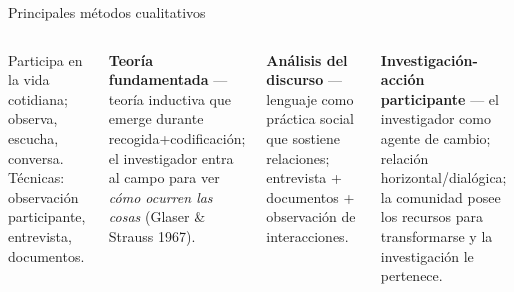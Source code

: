 \documentclass[aspectratio=169,8pt]{beamer}
\begin{document}
\begin{frame}{Principales m\'etodos cualitativos}
  \small
  \begin{columns}[T,onlytextwidth]
      \begin{tcolorbox}[formulabox,title=Etnogr\'afico / naturalista]
        \footnotesize Participa en la vida cotidiana; observa, escucha, conversa. T\'ecnicas: observaci\'on participante, entrevista, documentos.
      \end{tcolorbox}
      \begin{tcolorbox}[tealbox]
        \footnotesize\textbf{Teor\'ia fundamentada} --- teor\'ia inductiva que emerge durante recogida+codificaci\'on; el investigador entra al campo para ver \emph{c\'omo ocurren las cosas} (Glaser \& Strauss 1967).
      \end{tcolorbox}
      \begin{tcolorbox}[amberbox]
        \footnotesize\textbf{An\'alisis del discurso} --- lenguaje como pr\'actica social que sostiene relaciones; entrevista + documentos + observaci\'on de interacciones.
      \end{tcolorbox}
      \begin{tcolorbox}[purplebox]
        \footnotesize\textbf{Investigaci\'on-acci\'on participante} --- el investigador como agente de cambio; relaci\'on horizontal/dial\'ogica; la comunidad posee los recursos para transformarse y la investigaci\'on le pertenece.
      \end{tcolorbox}
  \end{columns}
\end{frame}
\end{document}
